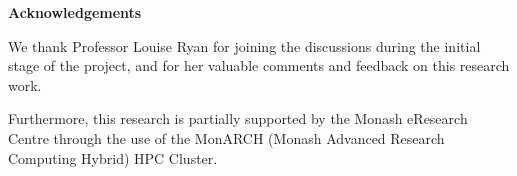 \documentclass[
  11pt,
  a4paper,
]{article}
\begin{document}
\textbf{\large{Acknowledgements}}

We thank Professor Louise Ryan for joining the discussions during the
initial stage of the project, and for her valuable comments and feedback
on this research work.

Furthermore, this research is partially supported by the Monash
eResearch Centre through the use of the MonARCH (Monash Advanced
Research Computing Hybrid) HPC Cluster.


\printbibliography
\end{document}
